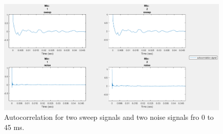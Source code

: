 \documentclass[a4paper]{article}
\begin{document}
\begin{figure}
	\centering
	\includegraphics[width=0.75\linewidth]{autocorrelation.png}
	\caption{Autocorrelation for two sweep signals and two noise signals fro 0 to 45 ms.}
	\label{fig:autocorr}
\end{figure}
\end{document}
